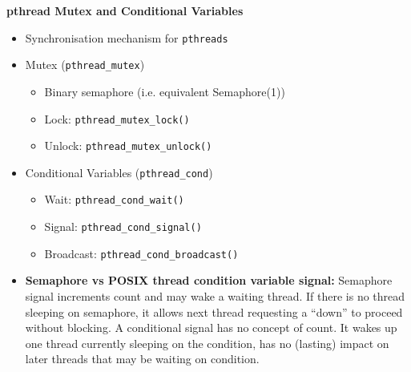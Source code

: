 \documentclass[10pt,landscape]{article}
\begin{document}
\begin{multicols*}{3}

\textbf{pthread Mutex and Conditional Variables}
\begin{itemize}[topsep=0pt,noitemsep,wide=0pt, leftmargin=\dimexpr{} + 2\relax]
    \item Synchronisation mechanism for \verb|pthreads|
    \item Mutex (\verb|pthread_mutex|)
    \begin{itemize}[topsep=0pt,noitemsep,wide=0pt, leftmargin=\dimexpr{} + 2\relax]
        \item Binary semaphore (i.e. equivalent Semaphore(1))
        \item Lock: \verb|pthread_mutex_lock()|
        \item Unlock: \verb|pthread_mutex_unlock()|
    \end{itemize}
    \item Conditional Variables (\verb|pthread_cond|)
    \begin{itemize}[topsep=0pt,noitemsep,wide=0pt, leftmargin=\dimexpr{} + 2\relax]
        \item Wait: \verb|pthread_cond_wait()|
        \item Signal: \verb|pthread_cond_signal()|
        \item Broadcast: \verb|pthread_cond_broadcast()|
    \end{itemize}
    \item \textbf{Semaphore vs POSIX thread condition variable signal:}
    Semaphore signal increments count and may wake a waiting thread. If there is no thread
    sleeping on semaphore, it allows next thread requesting a “down” to proceed without
    blocking. A conditional signal has no concept of count. It wakes up one thread currently sleeping on
the condition, has no (lasting) impact on later threads that may be waiting on condition.
\end{itemize}


\end{multicols*}
\end{document}
